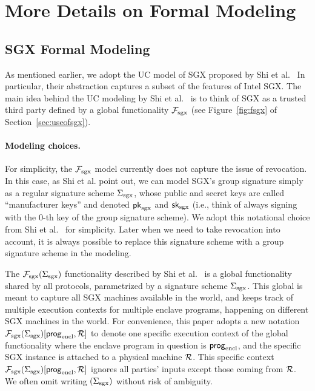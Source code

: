 
\newcommand{\ucstring}[1]{{\color{black} #1}}

\section{More Details on Formal Modeling} 
\subsection{SGX Formal Modeling}
\label{sec:sgxmodel}


As mentioned earlier, we adopt the 
UC model of SGX proposed by Shi et al.~\cite{sgxsok}
In particular, their 
abstraction captures a subset of the features 
of Intel SGX. 
The main idea behind the UC modeling by Shi et al.~\cite{sgxsok}
is to think of SGX 
as a trusted third party defined by 
a global functionality $\mathcal{F}_{\textrm{sgx}}$ (see Figure~\ref{fig:fsgx} of 
Section~\ref{sec:useofsgx}).

\paragraph{Modeling choices.}
For simplicity, the $\mathcal{F}_{\textrm{sgx}}$ model currently does not 
capture the issue of revocation.
In this case, as Shi et al. point out, 
we can model SGX's group signature
simply as a regular signature scheme ${\Sigma_{\textrm{sgx}}}$, whose
public and secret keys 
are called ``manufacturer keys'' and denoted ${\sf pk}_{\mathrm{sgx}}$ and ${\sf sk}_{\mathrm{sgx}}$ 
(i.e., think of always signing 
with the 0-th key of the group signature scheme).
We adopt this notational choice from Shi et al.~\cite{sgxsok} %
for simplicity. Later when 
we need to take revocation into account,
it is always possible to replace this signature 
scheme with a group signature scheme in the modeling.

The $\mathcal{F}_{\textrm{sgx}}({\Sigma_{\textrm{sgx}}})$ functionality described by Shi et al.~\cite{sgxsok} %
is a global functionality shared by all protocols, parametrized
by a signature scheme ${\Sigma_{\textrm{sgx}}}$.
This global \fsgx 
is meant to capture all SGX machines available in the world,
and keeps track of 
multiple execution contexts
for multiple enclave programs, happening on different SGX machines in the world.
For convenience, 
this paper adopts a new notation
$\mathcal{F}_{\textrm{sgx}}({\Sigma_{\textrm{sgx}}})[{\sf prog}_{\textrm{encl}}, \mathcal{R}]$
to denote 
one specific execution context of the global \fsgx
functionality where the enclave program in question is ${\sf prog}_{\textrm{encl}}$,
and the specific SGX instance is attached to a physical machine $\mathcal{R}$.
This specific context 
$\mathcal{F}_{\textrm{sgx}}({\Sigma_{\textrm{sgx}}})[{\sf prog}_{\textrm{encl}}, \mathcal{R}]$
ignores all parties' inputs except those coming from $\mathcal{R}$.
We often omit writing $({\Sigma_{\textrm{sgx}}})$ without risk of ambiguity.


